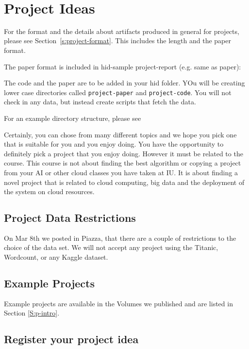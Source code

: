 \FILENAME\
\section{Project Ideas}
\label{s:project-ideas}

For the format and the details about artifacts produced in general for
projects, please see Section~\ref{s:project-format}. This includes the
length and the paper format.

The	paper format is included in hid-sample project-report (e.g. same as paper):


The code and the paper are to be added in your hid folder. YOu will be
creating lower case directories called \verb|project-paper| and
\verb|project-code|. You will not check in any data, but instead
create scripts that fetch the data.

For an example directory structure, please see 


Certainly, you can chose from many different topics and we hope you
pick one that is suitable for you and you enjoy doing. You have the
opportunity to definitely pick a project that you enjoy doing. However
it must be related to the course. This course is not about finding the
best algorithm or copying a project from your AI or other cloud
classes you have taken at IU. It is about finding a novel project that
is related to cloud computing, big data and the deployment of the
system on cloud resources.

\subsection{Project Data Restrictions}

On Mar 8th we posted in Piazza, that there are  a couple of
restrictions to the choice of the data set. We will not accept any
project using the Titanic, Wordcount, or any Kaggle dataset. 


\subsection{Example Projects}

Example projects are available in the Volumes we published and are
listed in Section \ref{S:p-intro}.

\subsection{Register your project idea}


